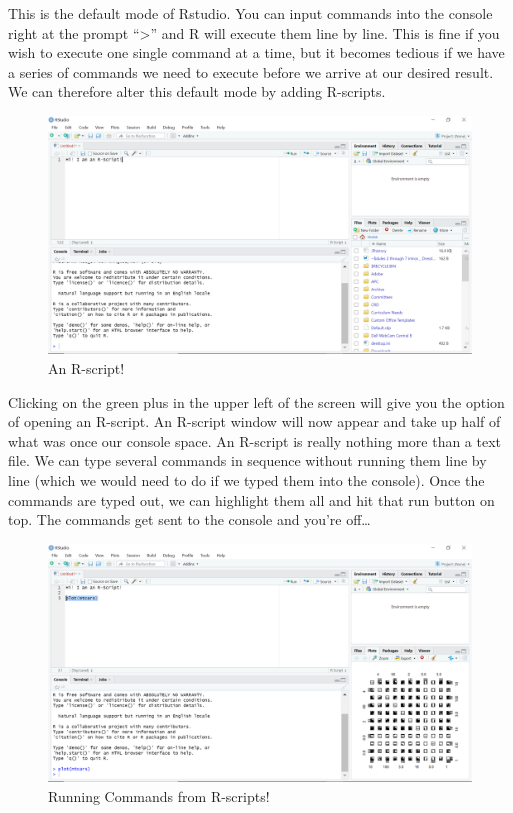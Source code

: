 \documentclass[
]{book}
\begin{document}
This is the default mode of Rstudio. You can input commands into the console right at the prompt ``\textgreater{}'' and R will execute them line by line. This is fine if you wish to execute one single command at a time, but it becomes tedious if we have a series of commands we need to execute before we arrive at our desired result. We can therefore alter this default mode by adding R-scripts.

\begin{figure}

{\centering \includegraphics[width=0.75\linewidth]{images/Screenshot2} 

}

\caption{An R-script!}\label{fig:unnamed-chunk-30}
\end{figure}

Clicking on the green plus in the upper left of the screen will give you the option of opening an R-script. An R-script window will now appear and take up half of what was once our console space. An R-script is really nothing more than a text file. We can type several commands in sequence without running them line by line (which we would need to do if we typed them into the console). Once the commands are typed out, we can highlight them all and hit that run button on top. The commands get sent to the console and you're off\ldots{}

\begin{figure}

{\centering \includegraphics[width=0.75\linewidth]{images/Screenshot3} 

}

\caption{Running Commands from R-scripts!}\label{fig:unnamed-chunk-31}
\end{figure}
\end{document}

